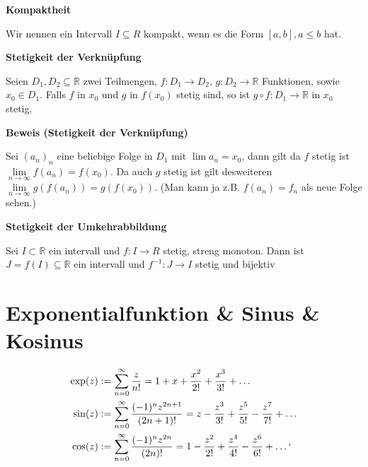 \documentclass[25pt]{sciposter}
\newcommand{\limm}{\lim\limits_{n \to \infty}}
\newcommand{\R}{\mathbb{R}}
\newenvironment{method}[1]{\begin{mdframed}[backgroundcolor=blue!10,innertopmargin=15pt, innerbottommargin=15pt, nobreak=true]
		\textbf{#1 }
	}
	{ 
	\end{mdframed}
}
\begin{document}
\begin{multicols}{3}
\begin{method}{Kompaktheit}
	Wir nennen ein Intervall $I \subseteq R$ kompakt, wenn es die Form $[a,b], a \leq b$ hat.
\end{method}


\begin{method}{Stetigkeit der Verknüpfung}
Seien $D_1, D_2 \subseteq \R$ zwei Teilmengen, $f: D_1 \to D_2$, $g:D_2 \to \R$ Funktionen, sowie $x_0 \in D_1$. Falls $f$ in $x_0$ und $g$ in $f(x_0)$ stetig sind, so ist $g \circ f : D_1 \to \R$ in $x_0$ stetig.
\end{method}

\textbf{Beweis (Stetigkeit der Verknüpfung)}

Sei $(a_n)_n$ eine beliebige Folge in $D_1$ mit $\lim a_n = x_0$, dann gilt da $f$ stetig ist $\limm f(a_n) = f(x_0)$. Da auch $g$ stetig ist gilt desweiteren $\limm g(f(a_n)) = g(f(x_0))$. (Man kann ja z.B. $f(a_n)=f_n$ als neue Folge sehen.)


\begin{method}{Stetigkeit der Umkehrabbildung}
	Sei $I \subset \R$ ein intervall und $f:I \to R$ stetig, streng monoton. Dann ist $J = f(I) \subseteq \R$ ein intervall und $f^{-1} : J \to I$ stetig und bijektiv
\end{method}



\section{Exponentialfunktion \& Sinus \& Kosinus}

\begin{align*}
	\operatorname{exp}(z) &:=\sum_{n=0}^{\infty} \frac{z}{n!} = 1 + x + \frac{x^2}{2!} + \frac{x^3}{3!} + \ldots\\
	\operatorname{sin}(z) &:=\sum_{n=0}^{\infty} \frac{(-1)^n z^{2n+1}}{(2n+1)!} = z - \frac{z^3}{3!}+ \frac{z^5}{5!} - \frac{z^7}{7!} + \ldots\\
	\operatorname{cos}(z) &:=\sum_{n=0}^{\infty} \frac{(-1)^n z^{2n}}{(2n)!} = 1 - \frac{z^2}{2!} + \frac{z^4}{4!} -\frac{z^6}{6!} + \ldots `
\end{align*}



\end{multicols}
\end{document}
